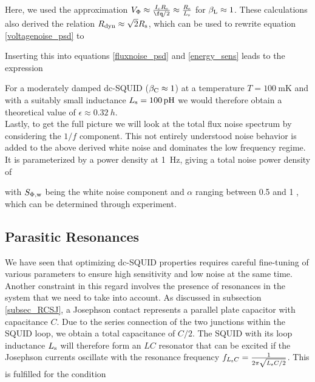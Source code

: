 
Here, we used the approximation $V_{\rm \Phi}\approx\frac{I_{\rm c}R_{\rm s}}{\unit{\fq}/2}\approx\frac{R_{\rm s}}{L_{\rm s}}$ for $\beta_{\rm L}\approx 1$. These calculations also derived the relation $R_{\rm dyn}\approx \sqrt{2}R_{\rm s}$, which can be used to rewrite equation \ref{voltagenoise_psd} to 


Inserting this into equations \ref{fluxnoise_psd} and \ref{energy_sens} leads to the expression


For a moderately damped dc-SQUID ($\beta_{\rm C}\approx 1$) at a temperature $T=\qty{100}{\milli\kelvin}$ and with a suitably small inductance $L_{\rm s}=\qty{100}{\pico\henry}$ we would therefore obtain a theoretical value of $\epsilon\approx \qty{0.32}{h}$. \\

Lastly, to get the full picture we will look at the total flux noise spectrum by considering the $1/f$ component. This not entirely understood noise behavior is added to the above derived white noise and dominates the low frequency regime. It is parameterized by a power density at \qty{1}{\hertz}, giving a total noise power density of      



with $S_{\rm \Phi,w}$ being the white noise component and $\alpha$ ranging between 0.5 and 1 \cite{Drung2011}, which can be determined through experiment.

\subsection{Parasitic Resonances}\label{subsec_para_res}

We have seen that optimizing dc-SQUID properties requires careful fine-tuning of various parameters to ensure high sensitivity and low noise at the same time. Another constraint in this regard involves the presence of resonances in the system that we need to take into account. As discussed in subsection \ref{subsec_RCSJ}, a Josephson contact represents a parallel plate capacitor with capacitance $C$. Due to the series connection of the two junctions within the SQUID loop, we obtain a total capacitance of $C/2$. The SQUID with its loop inductance $L_{\rm s}$ will therefore form an $LC$ resonator that can be excited if the Josephson currents oscillate with the resonance frequency $f_{L_{\rm s}C}=\frac{1}{2\pi\sqrt{L_{\rm s}C/2}}$. This is fulfilled for the condition 

